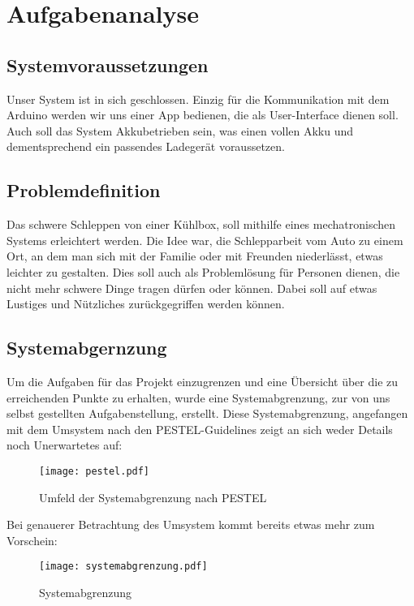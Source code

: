 \section{Aufgabenanalyse}

\subsection{Systemvoraussetzungen}
Unser System ist in sich geschlossen. Einzig für die Kommunikation mit dem Arduino werden wir uns einer App bedienen, die als User-Interface dienen soll. Auch soll das System Akkubetrieben sein, was einen vollen Akku und dementsprechend ein passendes Ladegerät voraussetzen.

\subsection{Problemdefinition}
Das schwere Schleppen von einer Kühlbox, soll mithilfe eines mechatronischen Systems erleichtert werden. Die Idee war, die Schlepparbeit vom Auto zu einem Ort, an dem man sich mit der Familie oder mit Freunden niederlässt, etwas leichter zu gestalten. Dies soll auch als Problemlösung für Personen dienen, die nicht mehr schwere Dinge tragen dürfen oder können. Dabei soll auf etwas Lustiges und Nützliches zurückgegriffen werden können.

\subsection{Systemabgernzung}
Um die Aufgaben für das Projekt einzugrenzen und eine Übersicht über die zu erreichenden Punkte zu erhalten, wurde eine Systemabgrenzung, zur von uns selbst gestellten Aufgabenstellung, erstellt. Diese Systemabgrenzung, angefangen mit dem Umsystem nach den PESTEL-Guidelines zeigt an sich weder Details noch Unerwartetes auf:

\begin{figure}[H]
    \begin{center}
    \texttt{[image: pestel.pdf]}
    \end{center}
    \caption{Umfeld der Systemabgrenzung nach PESTEL}
\end{figure}

Bei genauerer Betrachtung des Umsystem kommt bereits etwas mehr zum Vorschein:

\begin{figure}[H]
    \begin{center}
    \texttt{[image: systemabgrenzung.pdf]}
    \end{center}
    \caption{Systemabgrenzung}
    \label{fig:systemabgrenzung}
\end{figure}

